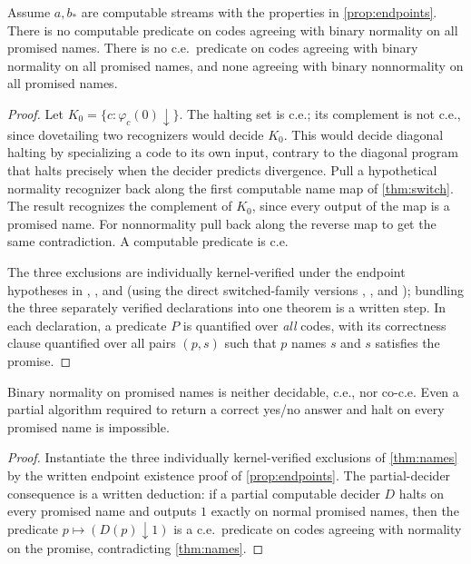 \documentclass[11pt]{article}
\begin{document}
\begin{theorem}\label{thm:names}
Assume \(a,b_*\) are computable streams with the properties in \cref{prop:endpoints}. There is no computable predicate on codes agreeing with binary normality on all promised names. There is no c.e.\ predicate on codes agreeing with binary normality on all promised names, and none agreeing with binary nonnormality on all promised names.
\end{theorem}
\begin{proof}
Let \(K_0=\{c:\varphi_c(0)\downarrow\}\). The halting set is c.e.; its complement is not c.e., since dovetailing two recognizers would decide \(K_0\). This would decide diagonal halting by specializing a code to its own input, contrary to the diagonal program that halts precisely when the decider predicts divergence. Pull a hypothetical normality recognizer back along the first computable name map of \cref{thm:switch}. The result recognizes the complement of \(K_0\), since every output of the map is a promised name. For nonnormality pull back along the reverse map to get the same contradiction. A computable predicate is c.e.

The three exclusions are individually kernel-verified under the endpoint hypotheses in ,
, and  (using the direct switched-family versions , , and ); bundling the three separately verified declarations into one theorem is a written step.
In each declaration, a predicate \(P\) is quantified over \emph{all} codes, with its correctness clause quantified over all pairs \((p,s)\) such that \(p\) names \(s\) and \(s\) satisfies the promise.
\end{proof}

\begin{corollary}\label{cor:instantiate}
Binary normality on promised names is neither decidable, c.e., nor co-c.e. Even a partial algorithm required to return a correct yes/no answer and halt on every promised name is impossible.
\end{corollary}
\begin{proof}
Instantiate the three individually kernel-verified exclusions of \cref{thm:names} by the written endpoint existence proof of \cref{prop:endpoints}. The partial-decider consequence is a written deduction: if a partial computable decider \(D\) halts on every promised name and outputs \(1\) exactly on normal promised names, then the predicate \(p\mapsto(D(p)\downarrow 1)\) is a c.e.\ predicate on codes agreeing with normality on the promise, contradicting \cref{thm:names}.
\end{proof}
\end{document}
